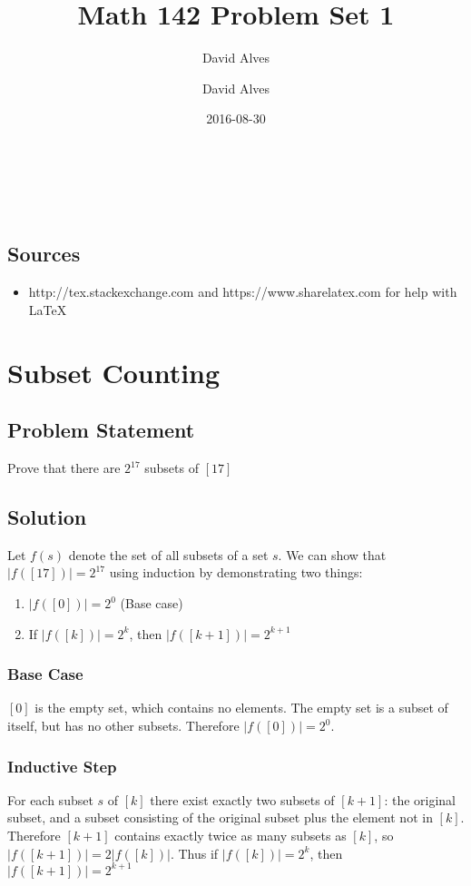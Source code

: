 \documentclass[12pt]{article}
\author{David Alves}
\title{Math 142 Problem Set 1}
\author{David Alves}
\date{2016-08-30}
\begin{document}

\begin{center}
\large \thetitle \\
\theauthor \\
\thedate
\end{center}

\subsection*{Sources}

    \begin{itemize}
    \item http://tex.stackexchange.com and https://www.sharelatex.com for help with \LaTeX
    \end{itemize}

\section*{Subset Counting}

\subsection*{Problem Statement}
Prove that there are $2^{17}$ subsets of $[17]$
\subsection*{Solution}
Let $f(s)$ denote the set of all subsets of a set $s$. We can show that $|f([17])| = 2^{17}$ using induction by demonstrating two things:

\begin{enumerate}
\item $|f([0])| = 2^0$ (Base case)
\item If $|f([k])| = 2^k$, then $|f([k+1])| = 2^{k+1}$
\end{enumerate}

\subsubsection*{Base Case}
$[0]$ is the empty set, which contains no elements. The empty set is a subset of itself, but has no other subsets. Therefore $|f([0])| = 2^0$.
\subsubsection*{Inductive Step}
For each subset $s$ of $[k]$ there exist exactly two subsets of $[k+1]$: the original subset, and a subset consisting of the original subset plus the element not in $[k]$. Therefore $[k+1]$ contains exactly twice as many subsets as $[k]$, so $|f([k+1])| = 2|f([k])|$. Thus if $|f([k])| = 2^k$, then $|f([k+1])| = 2^{k+1}$ 
\end{document}
